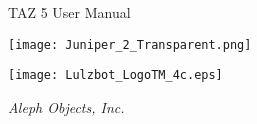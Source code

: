 %
%
%
%
%

\date {}
\thispagestyle{empty}
\begingroup
\centering 

\begin{center}
\fontsize{24pt}{1em}\selectfont TAZ 5
User Manual

\end{center}

\par


\texttt{[image: Juniper\_2\_Transparent.png]}

\begin{center}
\texttt{[image: Lulzbot\_LogoTM\_4c.eps]}

{\large \itshape Aleph Objects, Inc.}
\end{center}
\endgroup

